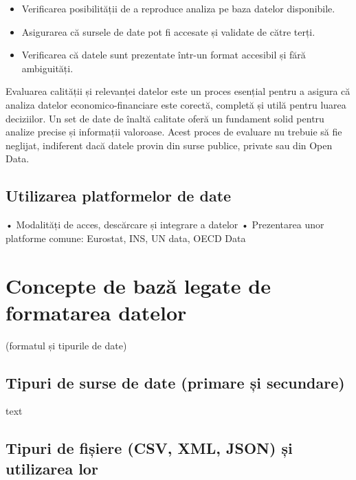 \documentclass[
  11pt,
  b5paper,
  nottoc]{book}
\providecommand{\tightlist}{%
  \setlength{\itemsep}{0pt}\setlength{\parskip}{0pt}}\usepackage{longtable,booktabs,array}
\begin{document}
\begin{itemize}
\tightlist
\item
  Verificarea posibilității de a reproduce analiza pe baza datelor
  disponibile.\\
\item
  Asigurarea că sursele de date pot fi accesate și validate de către
  terți.\\
\item
  Verificarea că datele sunt prezentate într-un format accesibil și fără
  ambiguități.
\end{itemize}

Evaluarea calității și relevanței datelor este un proces esențial pentru
a asigura că analiza datelor economico-financiare este corectă, completă
și utilă pentru luarea deciziilor. Un set de date de înaltă calitate
oferă un fundament solid pentru analize precise și informații valoroase.
Acest proces de evaluare nu trebuie să fie neglijat, indiferent dacă
datele provin din surse publice, private sau din Open Data.

\subsection{Utilizarea platformelor de
date}\label{utilizarea-platformelor-de-date}

• Modalități de acces, descărcare și integrare a datelor • Prezentarea
unor platforme comune: Eurostat, INS, UN data, OECD Data

\section{Concepte de bază legate de formatarea
datelor}\label{concepte-de-bazux103-legate-de-formatarea-datelor}

(formatul și tipurile de date)

\subsection{Tipuri de surse de date (primare și
secundare)}\label{tipuri-de-surse-de-date-primare-ux219i-secundare}

text

\subsection{Tipuri de fișiere (CSV, XML, JSON) și utilizarea
lor}\label{tipuri-de-fiux219iere-csv-xml-json-ux219i-utilizarea-lor}
\end{document}

